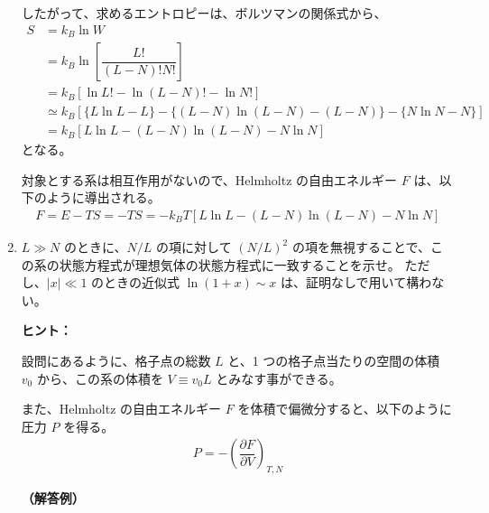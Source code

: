 \documentclass[uplatex,dvipdfmx,a4paper,11pt]{jsarticle}
\begin{document}
\begin{enumerate}
したがって、求めるエントロピーは、ボルツマンの関係式から、
\begin{align*}
S 
	&= k_B \ln W \\
	&= k_B \ln \left[ \dfrac{L!}{(L-N)! N!} \right] \\
	&= k_B \left[ \ln L! - \ln (L-N)! - \ln N! \right] \\
	&\simeq k_B \left[ \{ L\ln L -L\} - \{ (L-N)\ln (L-N) - (L-N) \} - \{N\ln N -N \} \right] \\
	&= k_B \left[ L\ln L - (L-N)\ln (L-N) - N\ln N \right] 
\end{align*}
となる。

対象とする系は相互作用がないので、Helmholtz の自由エネルギー $F$ は、以下のように導出される。
\begin{align*}
F=E-TS = -TS = -k_B T \left[ L\ln L - (L-N)\ln (L-N) - N\ln N \right] 
\end{align*}

\newpage

\item
$L \gg N$ のときに、$N/L$ の項に対して $(N/L)^2$ の項を無視することで、この系の状態方程式が理想気体の状態方程式に一致することを示せ。
ただし、$\vert x \vert \ll 1$ のときの近似式 $\ln (1+x) \sim x$ は、証明なしで用いて構わない。

\vspace{8pt}

\begin{itembox}[l]{{\bf ヒント：}}

設問にあるように、格子点の総数 $L$ と、1 つの格子点当たりの空間の体積 $v_0$ から、この系の体積を $V \equiv v_0 L$ とみなす事ができる。

また、Helmholtz の自由エネルギー $F$ を体積で偏微分すると、以下のように圧力 $P$ を得る。
\begin{align*}
P = -\left( \dfrac{\partial F}{\partial V} \right)_{T,N} 
\end{align*}
\end{itembox}

{\bf （解答例）}


\end{enumerate}
\end{document}
